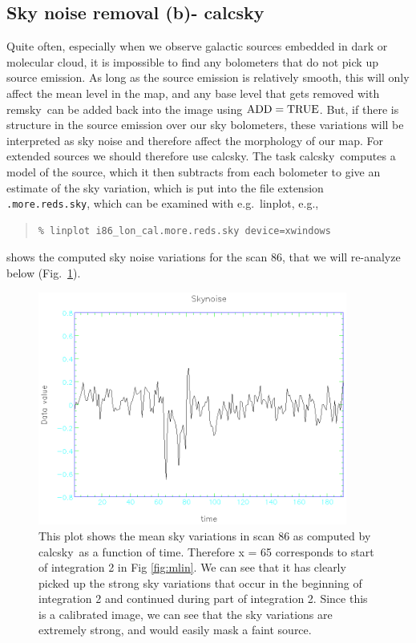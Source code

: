 \documentclass[twoside,11pt]{article}
\newenvironment{myquote}{\begin{quote}\begin{small}}{\end{small}\end{quote}}
\newcommand{\task}[1]{\textsf{#1}}
\newcommand{\calcsky}{\xref{\task{calcsky}}{sun216}{CALCSKY}}
\newcommand{\remsky}{\xref{\task{remsky}}{sun216}{REMSKY}}
\newcommand{\linplot}{\xref{\task{linplot}}{sun95}{LINPLOT}}
\newcommand{\xref}[3]{#1}
\newcommand{\xlabel}[1]{}
\renewcommand{\_}{\texttt{\symbol{95}}}
\begin{document}
\subsection{\xlabel{Sky_Noise_Removal_calcsky}Sky noise removal (b)-
\calcsky \label{Sky_Noise_Removal_calcsky}}

Quite often, especially when we observe galactic sources embedded in
dark or molecular cloud, it is impossible to find any bolometers that
do not pick up source emission.  As long as the source emission is
relatively smooth, this will only affect the mean level in the map,
and any base level that gets removed with \remsky\ can be added back
into the image using $\rm ADD=TRUE$.  But, if there is structure in
the source emission over our sky bolometers, these variations will be
interpreted as sky noise and therefore affect the morphology of our
map.  For extended sources we should therefore use \calcsky.  The task
\calcsky\ computes a model of the source, which it then subtracts from
each bolometer to give an estimate of the sky variation, which is put
into the file extension \texttt{.more.reds.sky}, which can be examined
with e.g.\ \linplot, e.g.,


\begin{myquote}
\begin{verbatim}
% linplot i86_lon_cal.more.reds.sky device=xwindows
\end{verbatim}
\end{myquote}

shows the computed sky noise variations for the scan 86, that we will
re-analyze below (Fig.\ \ref{fig:sky}).


\begin{figure}
\begin{center}
\includegraphics[width=4.0in]{sc11_fig5.eps}
\caption{This plot shows the mean sky variations in scan 86 as computed
by \calcsky\ as a function of time.  Therefore x = 65 corresponds to
start of integration 2 in Fig \ref{fig:mlin}. We can see that it has
clearly picked up the strong sky variations that occur in the beginning
of integration 2 and continued during part of integration 2.  Since
this is a calibrated image, we can see that the sky variations are
extremely strong, and would easily mask a faint source.}


\label{fig:sky}
\end{center}
\end{figure}
\end{document}
